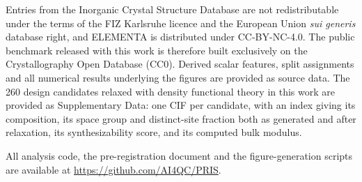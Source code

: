 \documentclass[pdflatex,sn-nature]{sn-jnl}%
\begin{document}


\author[1,2]{}

\author*[1,2,3]{}





\maketitle







\backmatter

Entries from the Inorganic Crystal Structure Database are not redistributable under
the terms of the FIZ Karlsruhe licence and the European Union \emph{sui generis}
database right, and ELEMENTA is distributed under CC-BY-NC-4.0. The public benchmark
released with this work is therefore built exclusively on the Crystallography Open
Database (CC0). Derived scalar features, split assignments and all numerical results
underlying the figures are provided as source data. The 260 design candidates
relaxed with density functional theory in this work are provided as Supplementary
Data: one CIF per candidate, with an index giving its composition, its space
group and distinct-site fraction both as generated and after relaxation, its
synthesizability score, and its computed bulk modulus.

All analysis code, the pre-registration document and the figure-generation scripts
are available at \url{https://github.com/AI4QC/PRIS}.
\end{document}
